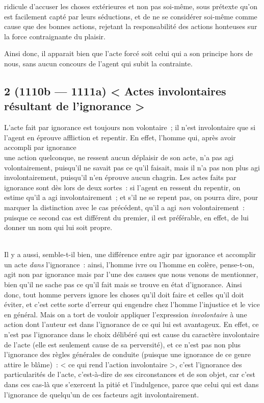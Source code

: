 \documentclass[french,twoside]{book} %
\begin{document}
ridicule d’accuser les choses extérieures et non pas soi-même, sous prétexte qu’on est facilement capté par leurs séductions, et de ne se considérer soi-même comme cause que des bonnes actions, rejetant la responsabilité des actions honteuses sur la force contraignante du plaisir.\par
Ainsi donc, il apparait bien que l’acte forcé soit celui qui a son principe hors de nous, sans aucun concours de l’agent qui subit la contrainte.
\subsection[{2 (1110b — 1111a) < Actes involontaires résultant de l’ignorance >}]{2 (1110b — 1111a) < Actes involontaires résultant de l’ignorance >}
\noindent L’acte fait par ignorance est toujours non volontaire ; il n’est involontaire que si l’agent en éprouve affliction et repentir. En effet, l’homme qui, après avoir accompli par ignorance \\
une action quelconque, ne ressent aucun déplaisir de son acte, n’a pas agi volontairement, puisqu’il ne savait pas ce qu’il faisait, mais il n’a pas non plus agi involontairement, puisqu’il n’en éprouve aucun chagrin. Les actes faits par ignorance sont dès lors de deux sortes : si l’agent en ressent du repentir, on estime qu’il a agi involontairement ; et s’il ne se repent pas, on pourra dire, pour marquer la distinction avec le cas précédent, qu’il a agi {\itshape non} volontairement : puisque ce second cas est différent du premier, il est préférable, en effet, de lui donner un nom qui lui soit propre.\par
\\
Il y a aussi, semble-t-il bien, une différence entre agir par ignorance et accomplir un acte {\itshape dans} l’ignorance : ainsi, l’homme ivre ou l’homme en colère, pense-t-on, agit non par ignorance mais par l’une des causes que nous venons de mentionner, bien qu’il ne sache pas ce qu’il fait mais se trouve en état d’ignorance. Ainsi donc, tout homme pervers ignore les choses qu’il doit faire et celles qu’il doit éviter, et c’est cette sorte d’erreur qui engendre chez l’homme l’injustice et le vice \\
en général. Mais on a tort de vouloir appliquer l’expression {\itshape involontaire} à une action dont l’auteur est dans l’ignorance de ce qui lui est avantageux. En effet, ce n’est pas l’ignorance dans le choix délibéré qui est cause du caractère involontaire de l’acte (elle est seulement cause de sa perversité), et ce n’est pas non plus l’ignorance des règles générales de conduite (puisque une ignorance de ce genre attire le blâme) : < ce qui rend l’action involontaire >, c’est l’ignorance des particularités  de l’acte, c’est-à-dire de ses circonstances et de son objet, car c’est dans ces cas-là que s’exercent la pitié et l’indulgence, parce que celui qui est dans l’ignorance de quelqu’un de ces facteurs agit involontairement.\par
\end{document}
